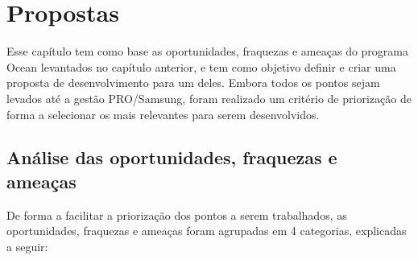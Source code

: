 \chapter{Propostas}
\label{cha:propostas}

Esse capítulo tem como base as oportunidades, fraquezas e ameaças do programa Ocean levantados no capítulo anterior, e tem como objetivo definir e criar uma proposta de desenvolvimento para um deles. Embora todos os pontos sejam levados até a gestão PRO/Samsung, foram realizado um critério de priorização de forma a selecionar os mais relevantes para serem desenvolvidos.

\section{Análise das oportunidades, fraquezas e ameaças}

De forma a facilitar a priorização dos pontos a serem trabalhados, as oportunidades, fraquezas e ameaças foram agrupadas em 4 categorias, explicadas a seguir: 

